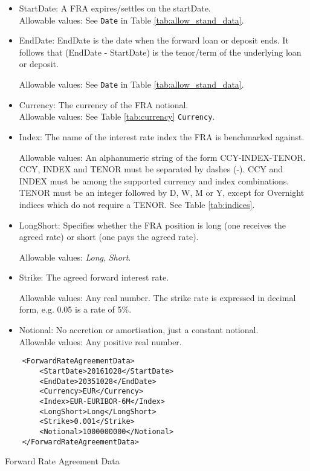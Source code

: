 \begin{itemize}
\item StartDate: A FRA expires/settles on the startDate. \\

Allowable values:  See \lstinline!Date! in Table \ref{tab:allow_stand_data}.

\item EndDate: EndDate is the date when the forward loan or deposit ends. It follows that (EndDate - StartDate) is the tenor/term of the underlying loan or deposit.

Allowable values:  See \lstinline!Date! in Table \ref{tab:allow_stand_data}.
\item Currency: The currency of the FRA notional. \\

Allowable values:  See Table \ref{tab:currency} \lstinline!Currency!.	
\item Index: The name of the interest rate index the FRA is benchmarked against.

  Allowable values: An alphanumeric string of the form CCY-INDEX-TENOR. CCY, INDEX and TENOR must be separated by dashes (-). CCY and INDEX must be among the supported currency and index combinations. TENOR must be an integer followed by D, W,
  M or Y, except for Overnight indices which do not require a TENOR. See Table \ref{tab:indices}.
    
\item LongShort: Specifies whether the FRA position is long (one receives the agreed rate) or short (one pays the agreed rate).

Allowable values: \emph{Long}, \emph{Short}.
\item Strike: The agreed forward interest rate.

Allowable values: Any  real number. The strike rate is
  expressed in decimal form, e.g. 0.05 is a rate of 5\%.
\item Notional: No accretion or amortisation, just a constant notional. \\
Allowable values:  Any positive real number.
\end{itemize}


\begin{listing}[H]
\begin{verbatim}
    <ForwardRateAgreementData>
        <StartDate>20161028</StartDate>
        <EndDate>20351028</EndDate>
        <Currency>EUR</Currency>
        <Index>EUR-EURIBOR-6M</Index>
        <LongShort>Long</LongShort>
        <Strike>0.001</Strike>
        <Notional>1000000000</Notional>
    </ForwardRateAgreementData>
\end{verbatim}
\caption{Forward Rate Agreement Data}
\label{lst:ForwardRateAgreementdata}
\end{listing}
